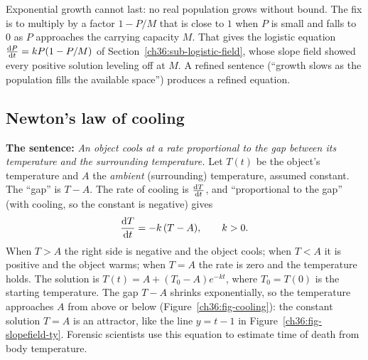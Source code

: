 Exponential growth cannot last: no real population grows without bound. The fix is to multiply by a factor $1 - P/M$ that is close to $1$ when $P$ is small and falls to $0$ as $P$ approaches the carrying capacity $M$. That gives the logistic equation $\frac{\mathrm{d} P}{\mathrm{d} t} = kP(1 - P/M)$ of Section~\ref{ch36:sub-logistic-field}, whose slope field showed every positive solution leveling off at $M$. A refined sentence (``growth slows as the population fills the available space'') produces a refined equation.

\subsection{Newton's law of cooling}

\begin{applicationbox}
\textbf{The sentence:} \emph{An object cools at a rate proportional to the gap between its temperature and the surrounding temperature.} Let $T(t)$ be the object's temperature and $A$ the \emph{ambient} (surrounding) temperature, assumed constant. The ``gap'' is $T - A$. The rate of cooling is $\frac{\mathrm{d} T}{\mathrm{d} t}$, and ``proportional to the gap'' (with cooling, so the constant is negative) gives
\[
  \frac{\mathrm{d} T}{\mathrm{d} t} = -k\,(T - A), \qquad k > 0.
\]
When $T > A$ the right side is negative and the object cools; when $T < A$ it is positive and the object warms; when $T = A$ the rate is zero and the temperature holds. The solution is $T(t) = A + (T_0 - A)e^{-kt}$, where $T_0 = T(0)$ is the starting temperature. The gap $T-A$ shrinks exponentially, so the temperature approaches $A$ from above or below (Figure~\ref{ch36:fig-cooling}): the constant solution $T=A$ is an attractor, like the line $y=t-1$ in Figure~\ref{ch36:fig-slopefield-ty}. Forensic scientists use this equation to estimate time of death from body temperature.
\end{applicationbox}

